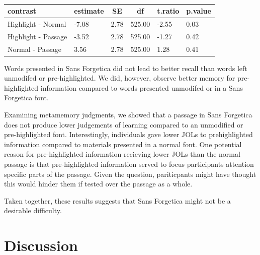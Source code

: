 \documentclass[english,pdf]{apa6}
\begin{document}
\begin{table}[tbp]

\begin{center}
\begin{threeparttable}

\caption{\label{tab:unnamed-chunk-4}}

\begin{tabular}{llllll}
\toprule
contrast & \multicolumn{1}{c}{estimate} & \multicolumn{1}{c}{SE} & \multicolumn{1}{c}{df} & \multicolumn{1}{c}{t.ratio} & \multicolumn{1}{c}{p.value}\\
\midrule
Highlight - Normal & -7.08 & 2.78 & 525.00 & -2.55 & 0.03\\
Highlight - Passage & -3.52 & 2.78 & 525.00 & -1.27 & 0.42\\
Normal - Passage & 3.56 & 2.78 & 525.00 & 1.28 & 0.41\\
\bottomrule
\end{tabular}

\end{threeparttable}
\end{center}

\end{table}

Words presented in Sans Forgetica did not lead to better recall than words left unmodifed or pre-highlighted. We did, however, observe better memory for pre-highlighted information compared to words presented unmodifed or in a Sans Forgetica font.

Examining metamemory judgments, we showed that a passage in Sans Forgetica does not produce lower judgements of learning compared to an unmodified or pre-highlighted font. Interestingly, individuals gave lower JOLs to prehighlighted information compared to materials presented in a normal font. One potential reason for pre-highlighted information recieving lower JOLs than the normal passage is that pre-highlighted information served to focus participants attention specific parts of the passage. Given the question, pariticpants might have thought this would hinder them if tested over the passage as a whole.

Taken together, these results suggests that Sans Forgetica might not be a desirable difficulty.

\hypertarget{discussion}{%
\section{Discussion}\label{discussion}}
\end{document}
